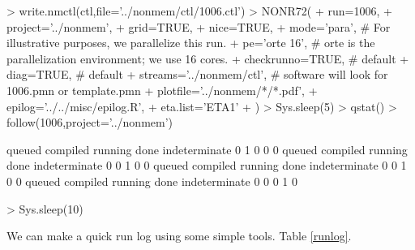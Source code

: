 \begin{Schunk}
\begin{Sinput}
> write.nmctl(ctl,file='../nonmem/ctl/1006.ctl')
> NONR72(
+      run=1006,
+      project='../nonmem',
+      grid=TRUE,
+      nice=TRUE,
+      mode='para',                         # For illustrative purposes, we parallelize this run.
+      pe='orte 16',                        # orte is the parallelization environment; we use 16 cores.
+      checkrunno=TRUE,                     # default
+      diag=TRUE,                           # default
+      streams='../nonmem/ctl',             # software will look for 1006.pmn or template.pmn
+      plotfile='../nonmem/*/*.pdf',
+      epilog='../../misc/epilog.R',
+      eta.list='ETA1'
+ )
> Sys.sleep(5)
> qstat()
> follow(1006,project='../nonmem')
\end{Sinput}
\begin{Soutput}
       queued      compiled       running          done indeterminate 
            0             1             0             0             0 
       queued      compiled       running          done indeterminate 
            0             0             1             0             0 
       queued      compiled       running          done indeterminate 
            0             0             1             0             0 
       queued      compiled       running          done indeterminate 
            0             0             0             1             0 
\end{Soutput}
\begin{Sinput}
> Sys.sleep(10)
\end{Sinput}
\end{Schunk}
We can make a quick run log using some simple tools. Table \ref{runlog}.
